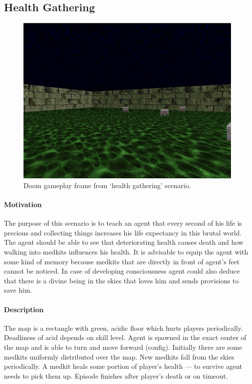 \documentclass[english,bachelor,a4paper,twoside]{ppfcmthesis}
\begin{document}
	\subsection{Health Gathering}
		\begin{figure}
			\centering
			\includegraphics[scale=0.5]{health_gathering.png}
			\caption{Doom gameplay frame from `health gathering' scenario.}\label{fig:health_gathering}
		\end{figure}
		\paragraph{Motivation}
			The purpose of this scenario is to teach an agent that every second of his life is precious and collecting things increases his life expectancy in this brutal world. The agent should be able to see that deteriorating health causes death and how walking into medkits influences his health. It is advisable to equip the agent with some kind of memory because medkits that are directly in front of agent's feet cannot be noticed. In case of developing consciousness agent could also deduce that there is a divine being in the skies that loves him and sends provisions to save him.

		\paragraph{Description}
			The map is a rectangle with green, acidic floor which hurts players periodically. Deadliness of acid depends on skill level. Agent is spawned in the exact center of the map and is able to turn and move forward (config).  Initially there are some medkits uniformly distributed over the map. New medkits fall from the skies periodically. A medkit heals some portion of player's health --- to survive agent needs to pick them up. Episode finishes after player's death or on timeout.
\end{document}
